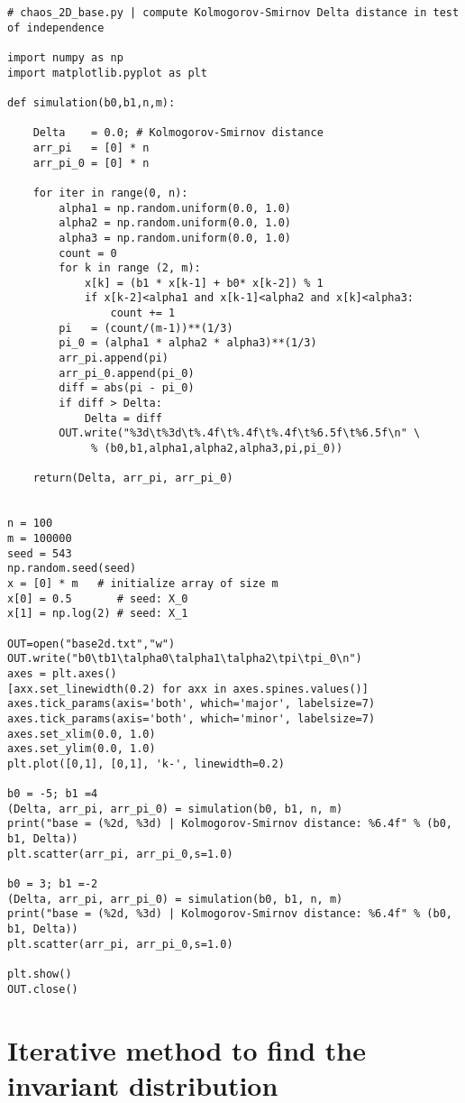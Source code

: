 \documentclass[oneside,10pt]{book}
\begin{document}
\begin{lstlisting}
# chaos_2D_base.py | compute Kolmogorov-Smirnov Delta distance in test of independence

import numpy as np
import matplotlib.pyplot as plt

def simulation(b0,b1,n,m):

    Delta    = 0.0; # Kolmogorov-Smirnov distance
    arr_pi   = [0] * n
    arr_pi_0 = [0] * n

    for iter in range(0, n):
        alpha1 = np.random.uniform(0.0, 1.0)
        alpha2 = np.random.uniform(0.0, 1.0)
        alpha3 = np.random.uniform(0.0, 1.0)
        count = 0
        for k in range (2, m):
            x[k] = (b1 * x[k-1] + b0* x[k-2]) % 1
            if x[k-2]<alpha1 and x[k-1]<alpha2 and x[k]<alpha3:
                count += 1
        pi   = (count/(m-1))**(1/3)
        pi_0 = (alpha1 * alpha2 * alpha3)**(1/3)
        arr_pi.append(pi)
        arr_pi_0.append(pi_0)
        diff = abs(pi - pi_0)
        if diff > Delta:
            Delta = diff
        OUT.write("%3d\t%3d\t%.4f\t%.4f\t%.4f\t%6.5f\t%6.5f\n" \
             % (b0,b1,alpha1,alpha2,alpha3,pi,pi_0))

    return(Delta, arr_pi, arr_pi_0)


n = 100
m = 100000
seed = 543
np.random.seed(seed)
x = [0] * m   # initialize array of size m
x[0] = 0.5       # seed: X_0
x[1] = np.log(2) # seed: X_1

OUT=open("base2d.txt","w")
OUT.write("b0\tb1\talpha0\talpha1\talpha2\tpi\tpi_0\n")
axes = plt.axes()
[axx.set_linewidth(0.2) for axx in axes.spines.values()]
axes.tick_params(axis='both', which='major', labelsize=7)
axes.tick_params(axis='both', which='minor', labelsize=7)
axes.set_xlim(0.0, 1.0)
axes.set_ylim(0.0, 1.0)
plt.plot([0,1], [0,1], 'k-', linewidth=0.2)

b0 = -5; b1 =4
(Delta, arr_pi, arr_pi_0) = simulation(b0, b1, n, m)
print("base = (%2d, %3d) | Kolmogorov-Smirnov distance: %6.4f" % (b0, b1, Delta))
plt.scatter(arr_pi, arr_pi_0,s=1.0)

b0 = 3; b1 =-2
(Delta, arr_pi, arr_pi_0) = simulation(b0, b1, n, m)
print("base = (%2d, %3d) | Kolmogorov-Smirnov distance: %6.4f" % (b0, b1, Delta))
plt.scatter(arr_pi, arr_pi_0,s=1.0)

plt.show()
OUT.close()
\end{lstlisting}



\section{Iterative method to find the invariant distribution}
\end{document}
